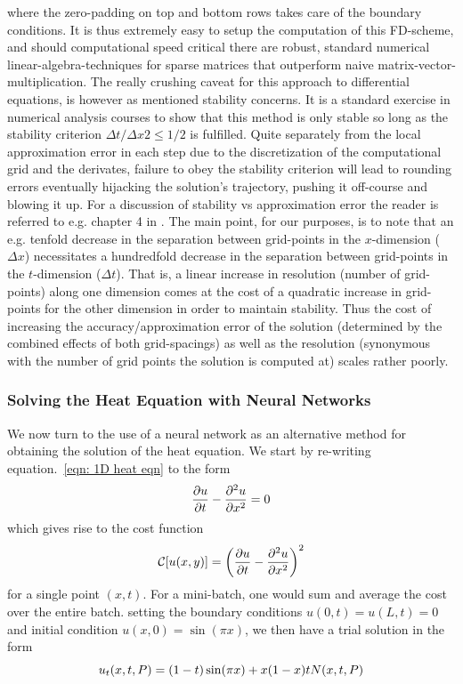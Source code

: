 \documentclass[reprint, english, nofootinbib]{revtex4-2}
\begin{document}
where the zero-padding on top and bottom rows takes care of the boundary conditions. It is thus extremely easy to setup the computation of this FD-scheme, and should computational speed critical there are robust, standard numerical linear-algebra-techniques for sparse matrices that outperform naive matrix-vector-multiplication. The really crushing caveat for this approach to differential equations, is however as mentioned stability concerns. It is a standard exercise in numerical analysis courses to show that this method is only stable so long as the stability criterion $\Delta t/\Delta x2 \leq 1/2$ is fulfilled. Quite separately from the local approximation error in each step due to the discretization of the computational grid and the derivates, failure to obey the stability criterion will lead to rounding errors eventually hijacking the solution's trajectory, pushing it off-course and blowing it up. For a discussion of stability vs approximation error the reader is referred to e.g. chapter 4 in \cite{Iserles}. The main point, for our purposes, is to note that an e.g. tenfold decrease in the separation between grid-points in the $x$-dimension ($\Delta x$) necessitates a hundredfold decrease in the separation between grid-points in the $t$-dimension ($\Delta t$). That is, a linear increase in resolution (number of grid-points) along one dimension comes at the cost of a quadratic increase in grid-points for the other dimension in order to maintain stability. Thus the cost of increasing the accuracy/approximation error of the solution (determined by the combined effects of both grid-spacings) as well as the resolution (synonymous with the number of grid points the solution is computed at) scales rather poorly.

\subsubsection{Solving the Heat Equation with Neural Networks}
\noindent
We now turn to the use of a neural network as an alternative method for obtaining the solution of the heat equation. We start by re-writing equation.~\ref{eqn: 1D heat eqn} to the form
\begin{equation}
    \pdv{u}{t} - \pdv[2]{u}{x} = 0
\end{equation}
which gives rise to the cost function 
\begin{equation}
    \mathcal C\qty[u\qty(x, y)] = \qty(\pdv{u}{t} - \pdv[2]{u}{x})^2
\end{equation}
for a single point $(x,t)$. For a mini-batch, one would sum and average the cost over the entire batch.
setting the boundary conditions $u(0, t) = u(L, t) = 0$ and initial condition $u(x, 0) = \sin(\pi x)$, we then have a trial solution in the form
\begin{equation}
    u_t(x, t, P) = \qty(1 - t)\sin(\pi x) + x(1 - x)t N(x, t, P)
\end{equation}
\end{document}
